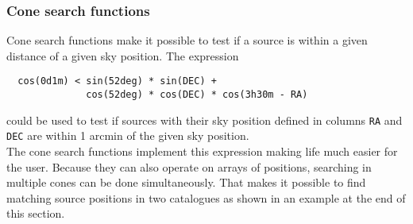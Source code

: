 \subsubsection{\label{TAQL:CONESEARCH}Cone search functions}
Cone search functions make it possible to test if a source is
within a given distance of a given sky position. The expression
\begin{verbatim}
  cos(0d1m) < sin(52deg) * sin(DEC) +
              cos(52deg) * cos(DEC) * cos(3h30m - RA)
\end{verbatim}
could be used to test if sources with their sky position defined
in columns \texttt{RA} and \texttt{DEC} are within 1 arcmin of the
given sky position.
\\The cone search functions implement this expression making life much
easier for the user. Because they
can also operate on arrays of positions, searching in
multiple cones can be done simultaneously. That makes it
possible to find matching source positions in two catalogues as shown
in an example at the end of this section.

